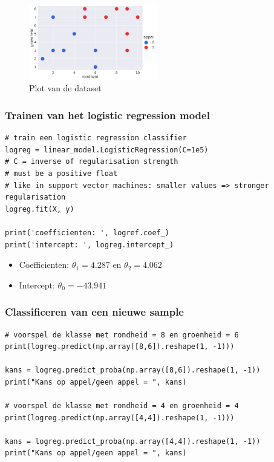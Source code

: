 \documentclass{article}
\begin{document}
\begin{figure}[H]
    \centering
    \includegraphics[width=0.5\textwidth]{logistic-sklearn-preprocessing.png}
    \caption{Plot van de dataset}
\end{figure}


\subsubsection{Trainen van het logistic regression model}

\begin{verbatim}
# train een logistic regression classifier
logreg = linear_model.LogisticRegression(C=1e5)
# C = inverse of regularisation strength
# must be a positive float
# like in support vector machines: smaller values => stronger regularisation
logreg.fit(X, y)

print('coefficienten: ', logref.coef_)
print('intercept: ', logreg.intercept_)

\end{verbatim}

\begin{itemize}
    \item Coefficienten: $\theta_1 = 4.287$ en $\theta_2 = 4.062$
    \item Intercept: $\theta_0 = -43.941$
\end{itemize}

\subsubsection{Classificeren van een nieuwe sample}

\begin{verbatim}
# voorspel de klasse met rondheid = 8 en groenheid = 6
print(logreg.predict(np.array([8,6]).reshape(1, -1)))

kans = logreg.predict_proba(np.array([8,6]).reshape(1, -1))
print("Kans op appel/geen appel = ", kans)

# voorspel de klasse met rondheid = 4 en groenheid = 4
print(logreg.predict(np.array([4,4]).reshape(1, -1)))

kans = logreg.predict_proba(np.array([4,4]).reshape(1, -1))
print("Kans op appel/geen appel = ", kans)
\end{verbatim}
\end{document}
